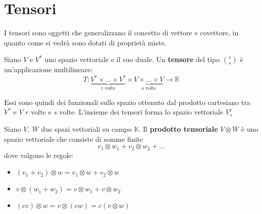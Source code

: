 \chapter{Tensori}
I tensori sono oggetti che generalizzano il concetto di vettore e covettore, in quanto come si vedrà sono dotati di proprietà miste.
\begin{definizione}
Siano $V$ e $V^*$ uno spazio vettoriale e il suo duale.
Un \textbf{tensore} del tipo $\binom{r}{s}$ è un'applicazione multilineare:
\begin{equation*}
    T : \underbrace{V^* \times \dots \times V^*}_\text{r volte} \times \underbrace{V \times \dots \times V}_\text{s volte} \rightarrow \mathbb{R}
\end{equation*}
\end{definizione}
Essi sono quindi dei funzionali sullo spazio ottenuto dal prodotto cartesiano tra $V^*$ e $V$ $r$ volte e $s$ volte.
L'insieme dei tensori forma lo spazio vettoriale $V^r_s$


\begin{definizione}
Siano $V, \ W$ due spazi vettoriali su campo $\mathbb{K}$. Il \textbf{prodotto tensoriale} $V \otimes W$ è uno spazio vettoriale che consiste di somme finite
\begin{equation*}
    v_1 \otimes w_1 + v_2 \otimes w_2 + \dots
\end{equation*}
dove valgono le regole:
\begin{itemize}
    \item $(v_1 + v_2)\otimes w = v_1 \otimes w + v_2 \otimes w$
    \item $v\otimes (w_1 + w_2)= v \otimes w_1 + v \otimes w_2$
    \item $(cv)\otimes w= v\otimes (cw) = c ( v \otimes w) $
\end{itemize}
\end{definizione}

